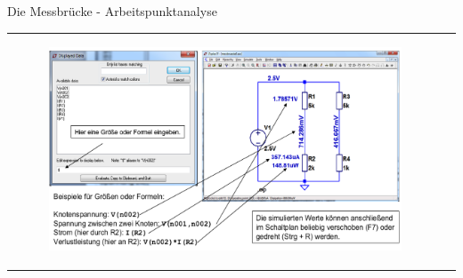 \begin{frame}[t]{Die Messbrücke - Arbeitspunktanalyse}
\begin{spacing}{0.9}
\begin{tiny}
\begin{table}[h!]
\begin{tabular}{p{3cm} p{7cm}}
\begin{minipage}{.7\textwidth}
            \begin{figure}
              \centering
              \includegraphics[width=0.8\linewidth]{pictures/manipulation.png}
            \end{figure}
          \end{minipage}
          \\
        \end{tabular}
      \end{table}
    \end{tiny} \end{spacing}


\end{frame}

